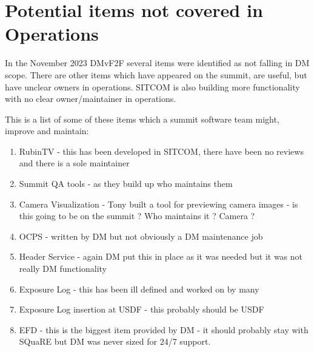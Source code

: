 \section{Potential items not covered in \gls{Operations}} \label{sec:items}

In the November 2023 DMvF2F several items were identified as not falling in \gls{DM} scope.
There are other items which have appeared on the summit, are useful, but have unclear owners in operations.
SITCOM is also building more functionality with no clear owner/maintainer in operations.

This is a list of some of these items which a summit \gls{software} team might, improve and maintain:

\begin{enumerate}
\item RubinTV - this has been developed in \gls{SITCOM}, there have been no reviews and there is a sole maintainer
\item Summit \gls{QA} tools - as they build up who maintains them
\item \gls{Camera} Visualization - Tony built a tool for previewing camera images - is this going to be on the summit ? Who maintains it ? \gls{Camera} ?
\item \gls{OCPS} - written by \gls{DM} but not obviously a \gls{DM} maintenance job
\item Header Service - again \gls{DM} put this in place as it was  needed but it was not really \gls{DM} functionality
\item Exposure Log - this has been ill defined and worked on by many
\item Exposure Log  insertion at \gls{USDF} - this probably  should be \gls{USDF}
\item \gls{EFD} - this is the biggest item provided by \gls{DM} - it should probably stay with SQuaRE but \gls{DM} was never sized for 24/7 support.
\end{enumerate}

